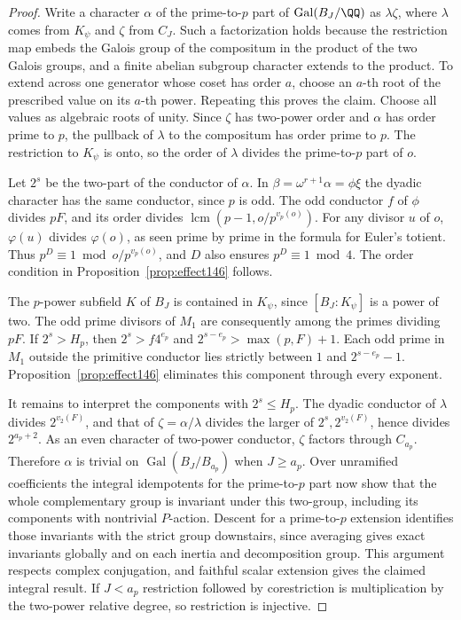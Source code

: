 \documentclass[a4paper,11pt]{article}
\theoremstyle{definition}
\theoremstyle{remark}
\numberwithin{equation}{section}
\begin{document}
\begin{proof}
Write a character \(\alpha\) of the prime-to-\(p\) part of
\(\operatorname{Gal}(B_J/\QQ)\) as \(\lambda\zeta\), where
\(\lambda\) comes from \(K_\psi\) and \(\zeta\) from \(C_J\).
Such a factorization holds because the restriction map embeds
the Galois group of the compositum in the product of the two
Galois groups, and a finite abelian subgroup character extends
to the product. To extend across one generator whose coset
has order \(a\), choose an \(a\)-th root of the prescribed
value on its \(a\)-th power. Repeating this proves the claim.
Choose all values as algebraic roots of unity. Since \(\zeta\)
has two-power order and \(\alpha\) has order prime to \(p\),
the pullback of \(\lambda\) to the compositum has order prime
to \(p\). The restriction to \(K_\psi\) is onto, so the order
of \(\lambda\) divides the prime-to-\(p\) part of \(o\).

Let \(2^s\) be the two-part of the conductor of \(\alpha\).
In \(\beta=\omega^{r+1}\alpha=\phi\xi\) the dyadic character
has the same conductor, since \(p\) is odd. The odd conductor
\(f\) of \(\phi\) divides \(pF\), and its order divides
\(\operatorname{lcm}(p-1,o/p^{v_p(o)})\). For any divisor
\(u\) of \(o\), \(\varphi(u)\) divides \(\varphi(o)\), as seen
prime by prime in the formula for Euler's totient. Thus
\(p^D\equiv1\bmod o/p^{v_p(o)}\), and \(D\) also ensures
\(p^D\equiv1\bmod4\). The order condition in
Proposition~\ref{prop:effect146} follows.

The \(p\)-power subfield \(K\) of \(B_J\) is contained in
\(K_\psi\), since \([B_J:K_\psi]\) is a power of two. The odd
prime divisors of \(M_1\) are consequently among the primes
dividing \(pF\). If \(2^s>H_p\), then \(2^s>f4^{e_p}\)
and \(2^{s-e_p}>\max(p,F)+1\). Each odd prime in \(M_1\)
outside the primitive conductor lies strictly between \(1\)
and \(2^{s-e_p}-1\). Proposition~\ref{prop:effect146}
eliminates this component through every exponent.

It remains to interpret the components with \(2^s\le H_p\).
The dyadic conductor of \(\lambda\) divides \(2^{v_2(F)}\),
and that of \(\zeta=\alpha/\lambda\) divides the larger of
\(2^s,2^{v_2(F)}\), hence divides \(2^{a_p+2}\).
As an even character of two-power conductor, \(\zeta\) factors
through \(C_{a_p}\). Therefore \(\alpha\) is trivial on
\(\operatorname{Gal}(B_J/B_{a_p})\) when \(J\ge a_p\).
Over unramified coefficients the integral idempotents for the
prime-to-\(p\) part now show that the whole complementary
group is invariant under this two-group, including its
components with nontrivial \(P\)-action. Descent for a
prime-to-\(p\) extension identifies those invariants with
the strict group downstairs, since averaging gives exact
invariants globally and on each inertia and decomposition
group. This argument respects complex conjugation, and faithful
scalar extension gives the claimed integral result. If \(J<a_p\)
restriction followed by corestriction is multiplication by the
two-power relative degree, so restriction is injective.


\end{proof}
\end{document}
